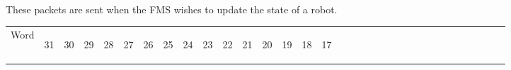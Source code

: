 \documentclass[11pt]{article}
\begin{document}
\paragraph{}
These packets are sent when the FMS wishes to update the state of a robot.
\newline
\begin{table}[h]
    \centering
    \label{tab:stateUpdateDef}
    \begin{tabular}{|p{1cm}|m{0.04cm}|m{0.04cm}|m{0.04cm}|m{0.04cm}|m{0.04cm}|m{0.04cm}|m{0.04cm}|m{0.04cm}|m{0.04cm}|
        m{0.04cm}|m{0.04cm}|m{0.04cm}|m{0.04cm}|m{0.04cm}|m{0.04cm}|m{0.04cm}|m{0.04cm}|m{0.04cm}|m{0.04cm}|m{0.04cm}|
        m{0.04cm}|m{0.04cm}|m{0.04cm}|m{0.04cm}|m{0.04cm}|m{0.04cm}|m{0.04cm}|m{0.04cm}|m{0.04cm}|m{0.04cm}|m{0.04cm}|m{0.04cm}|}
        \hline
        Word & 
        \begin{sideways}31\end{sideways} &
        \begin{sideways}30\end{sideways} & 
        \begin{sideways}29\end{sideways} &
        \begin{sideways}28\end{sideways} &
        \begin{sideways}27\end{sideways} &
        \begin{sideways}26\end{sideways} &
        \begin{sideways}25\end{sideways} &
        \begin{sideways}24\end{sideways} &
        \begin{sideways}23\end{sideways} &
        \begin{sideways}22\end{sideways} &
        \begin{sideways}21\end{sideways} &
        \begin{sideways}20\end{sideways} &
        \begin{sideways}19\end{sideways} &
        \begin{sideways}18\end{sideways} &
        \begin{sideways}17\end{sideways} &

\end{tabular}
\end{table}
\end{document}
